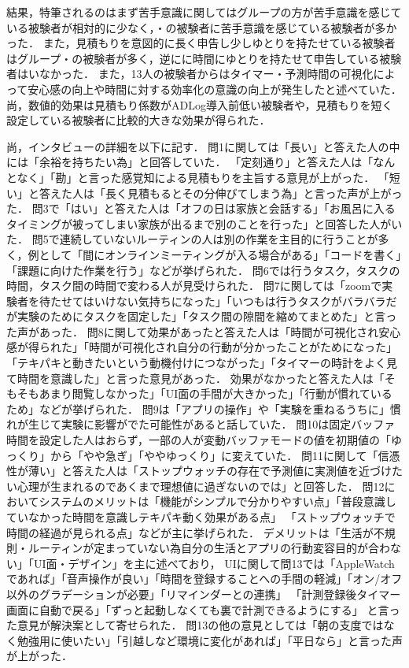 結果，特筆されるのはまず苦手意識に関してはグループの方が苦手意識を感じている被験者が相対的に少なく，・の被験者に苦手意識を感じている被験者が多かった．
また，見積もりを意図的に長く申告し少しゆとりを持たせている被験者はグループ・の被験者が多く，逆にに時間にゆとりを持たせて申告している被験者はいなかった．
また，13人の被験者からはタイマー・予測時間の可視化によって安心感の向上や時間に対する効率化の意識の向上が発生したと述べていた．
尚，数値的効果は見積もり係数がADLog導入前低い被験者や，見積もりを短く設定している被験者に比較的大きな効果が得られた．

尚，インタビューの詳細を以下に記す．
問1に関しては「長い」と答えた人の中には「余裕を持ちたい為」と回答していた．
「定刻通り」と答えた人は「なんとなく」「勘」と言った感覚知による見積もりを主旨する意見が上がった．
「短い」と答えた人は「長く見積もるとその分伸びてしまう為」と言った声が上がった．
問3で「はい」と答えた人は「オフの日は家族と会話する」「お風呂に入るタイミングが被ってしまい家族が出るまで別のことを行った」と回答した人がいた．
問5で連続していないルーティンの人は別の作業を主目的に行うことが多く，例として「間にオンラインミーティングが入る場合がある」「コードを書く」「課題に向けた作業を行う」などが挙げられた．
問6では行うタスク，タスクの時間，タスク間の時間で変わる人が見受けられた．
問7に関しては「zoomで実験者を待たせてはいけない気持ちになった」「いつもは行うタスクがバラバラだが実験のためにタスクを固定した」「タスク間の隙間を縮めてまとめた」と言った声があった．
問8に関して効果があったと答えた人は「時間が可視化され安心感が得られた」「時間が可視化され自分の行動が分かったことがためになった」
「テキパキと動きたいという動機付けにつながった」「タイマーの時計をよく見て時間を意識した」と言った意見があった．
効果がなかったと答えた人は「そもそもあまり閲覧しなかった」「UI面の手間が大きかった」「行動が慣れているため」などが挙げられた．
問9は「アプリの操作」や「実験を重ねるうちに」慣れが生じて実験に影響がでた可能性があると話していた．
問10は固定バッファ時間を設定した人はおらず，一部の人が変動バッファモードの値を初期値の「ゆっくり」から「やや急ぎ」「ややゆっくり」に変えていた．
問11に関して「信憑性が薄い」と答えた人は「ストップウォッチの存在で予測値に実測値を近づけたい心理が生まれるのであくまで理想値に過ぎないのでは」と回答した．
問12においてシステムのメリットは「機能がシンプルで分かりやすい点」「普段意識していなかった時間を意識しテキパキ動く効果がある点」
「ストップウォッチで時間の経過が見られる点」などが主に挙げられた．
デメリットは「生活が不規則・ルーティンが定まっていない為自分の生活とアプリの行動変容目的が合わない」「UI面・デザイン」を主に述べており，
UIに関して問13では「AppleWatchであれば」「音声操作が良い」「時間を登録することへの手間の軽減」「オン/オフ以外のグラデーションが必要」「リマインダーとの連携」
「計測登録後タイマー画面に自動で戻る」「ずっと起動しなくても裏で計測できるようにする」
と言った意見が解決案として寄せられた．
問13の他の意見としては「朝の支度ではなく勉強用に使いたい」「引越しなど環境に変化があれば」「平日なら」と言った声が上がった．

